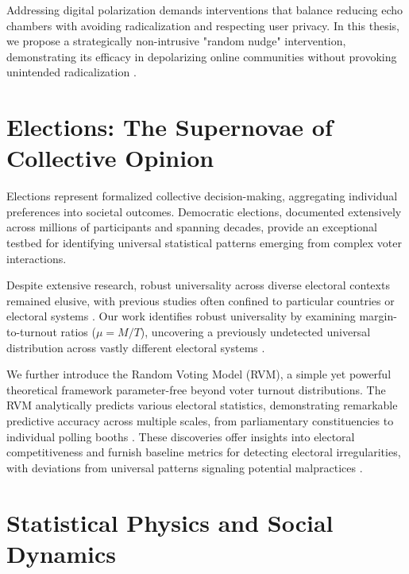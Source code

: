 Addressing digital polarization demands interventions that balance reducing echo chambers with avoiding radicalization and respecting user privacy. In this thesis, we propose a strategically non-intrusive "random nudge" intervention, demonstrating its efficacy in depolarizing online communities without provoking unintended radicalization \cite{depolarization-of-echo-chambers-by-random-dynamical-nudge}.

\section{Elections: The Supernovae of Collective Opinion}

Elections represent formalized collective decision-making, aggregating individual preferences into societal outcomes. Democratic elections, documented extensively across millions of participants and spanning decades, provide an exceptional testbed for identifying universal statistical patterns emerging from complex voter interactions.

Despite extensive research, robust universality across diverse electoral contexts remained elusive, with previous studies often confined to particular countries or electoral systems \cite{voting-contagion-modeling-and-analysis-of-a-century, scaling-and-universality-in-proportional-elections}. Our work identifies robust universality by examining margin-to-turnout ratios ($\mu = M/T$), uncovering a previously undetected universal distribution across vastly different electoral systems \cite{universal-statistics-of-competition}.

We further introduce the Random Voting Model (RVM), a simple yet powerful theoretical framework parameter-free beyond voter turnout distributions. The RVM analytically predicts various electoral statistics, demonstrating remarkable predictive accuracy across multiple scales, from parliamentary constituencies to individual polling booths \cite{universal-statistics-of-competition, voter-turnouts-govern-key-electoral-statistics}. These discoveries offer insights into electoral competitiveness and furnish baseline metrics for detecting electoral irregularities, with deviations from universal patterns signaling potential malpractices \cite{statistical-detection-of-systematic-election-irregularities, testing-for-voter-rigging-in-small-polling-stations}.

\section{Statistical Physics and Social Dynamics}

